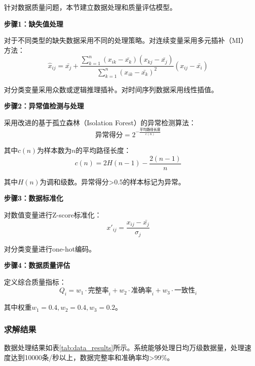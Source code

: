 针对数据质量问题，本节建立数据处理和质量评估模型。

\textbf{步骤1：缺失值处理}

对于不同类型的缺失数据采用不同的处理策略。对连续变量采用多元插补（MI）方法：
\begin{equation}
\hat{x}_{ij} = \bar{x_j} + \frac{\sum_{k=1}^{n}(x_{ik}-\bar{x_k})(x_{kj}-\bar{x_j})}{\sum_{k=1}^{n}(x_{ik}-\bar{x_k})^2} (x_{ij} - \bar{x_i})
\end{equation}

对分类变量采用众数或逻辑推理插补。对时间序列数据采用线性插值。

\textbf{步骤2：异常值检测与处理}

采用改进的基于孤立森林（Isolation Forest）的异常检测算法：
\begin{equation}
\text{异常得分} = 2^{-\frac{\text{平均路径长度}}{c(n)}}
\end{equation}

其中$c(n)$为样本数为$n$的平均路径长度：
\begin{equation}
c(n) = 2H(n-1) - \frac{2(n-1)}{n}
\end{equation}

其中$H(n)$为调和级数。异常得分>0.5的样本标记为异常。

\textbf{步骤3：数据标准化}

对数值变量进行Z-score标准化：
\begin{equation}
x'_{ij} = \frac{x_{ij} - \bar{x_j}}{\sigma_j}
\end{equation}

对分类变量进行one-hot编码。

\textbf{步骤4：数据质量评估}

定义综合质量指标：
\begin{equation}
Q_i = w_1 \cdot \text{完整率}_i + w_2 \cdot \text{准确率}_i + w_3 \cdot \text{一致性}_i
\end{equation}

其中权重$w_1=0.4, w_2=0.4, w_3=0.2$。

\subsubsection{求解结果}

数据处理结果如表\ref{tab:data_results}所示。系统能够处理日均万级数据量，处理速度达到10000条/秒以上，数据完整率和准确率均>99\%。
